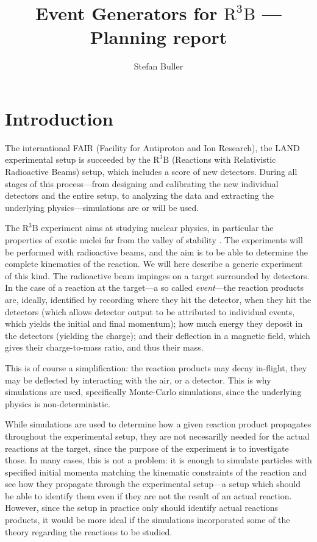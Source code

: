 \documentclass[12pt, a4paper]{article}
\newcommand{\rtb}{\ensuremath{\text{R}^3\text{B}}}
\begin{document}
\title{Event Generators for \rtb{} --- Planning report}
\author{Stefan Buller}
\maketitle
\section{Introduction}
The international FAIR (Facility for Antiproton and Ion Research), the LAND experimental setup is succeeded by the \rtb{} (Reactions with Relativistic Radioactive Beams) setup, which includes a score of new detectors. During all stages of this process---from designing and calibrating the new individual detectors and the entire setup, to analyzing the data and extracting the underlying physics---simulations are or will be used. 

The \rtb{} experiment aims at studying nuclear physics, in particular the properties of exotic nuclei far from the valley of stability \cite{r3b}. The experiments will be performed with radioactive beams, and the aim is to be able to determine the complete kinematics of the reaction. We will here describe a generic experiment of this kind.
The radioactive beam impinges on a target surrounded by detectors. In the case of a reaction at the target---a so called \emph{event}---the reaction products are, ideally, identified by recording where they hit the detector, when they hit the detectors (which allows detector output to be attributed to individual events, which yields the initial and final momentum); how much energy they deposit in the detectors (yielding the charge); and their deflection in a magnetic field, which gives their charge-to-mass ratio, and thus their mass. 

This is of course a simplification: the reaction products may decay in-flight, they may be deflected by interacting with the air, or a detector. This is why simulations are used, specifically Monte-Carlo simulations, since the underlying physics is non-deterministic. 

While simulations are used to determine how a given reaction product propagates throughout the experimental setup, they are not necesarilly needed for the actual reactions at the target, since the purpose of the experiment is to investigate those. 
In many cases, this is not a problem: it is enough to simulate particles with specified initial momenta matching the kinematic constraints of the reaction and see how they propagate through the experimental setup---a setup which should be able to identify them even if they are not the result of an actual reaction.
However, since the setup in practice only should identify actual reactions products, it would be more ideal if the simulations incorporated some of the theory regarding the reactions to be studied.
\end{document}
